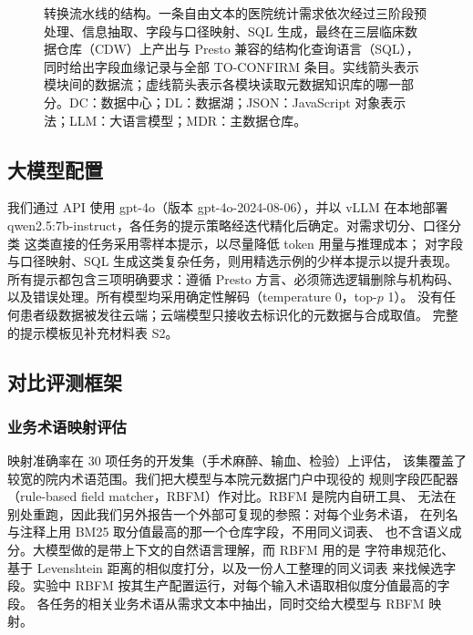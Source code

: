 \documentclass[11pt,a4paper]{article}
\begin{document}
\begin{figure}[H]
\caption{转换流水线的结构。一条自由文本的医院统计需求依次经过三阶段预处理、信息抽取、字段与口径映射、SQL 生成，最终在三层临床数据仓库（CDW）上产出与 Presto 兼容的结构化查询语言（SQL），同时给出字段血缘记录与全部 TO-CONFIRM 条目。实线箭头表示模块间的数据流；虚线箭头表示各模块读取元数据知识库的哪一部分。DC：数据中心；DL：数据湖；JSON：JavaScript 对象表示法；LLM：大语言模型；MDR：主数据仓库。}
\label{fig:arch}
\end{figure}

\subsection{大模型配置}
我们通过 API 使用 gpt-4o（版本 gpt-4o-2024-08-06），并以 vLLM 在本地部署
qwen2.5:7b-instruct，各任务的提示策略经迭代精化后确定。对需求切分、口径分类
这类直接的任务采用零样本提示，以尽量降低 token 用量与推理成本；
对字段与口径映射、SQL 生成这类复杂任务，则用精选示例的少样本提示以提升表现。
所有提示都包含三项明确要求：遵循 Presto 方言、必须筛选逻辑删除与机构码、
以及错误处理。所有模型均采用确定性解码（temperature 0，top-$p$ 1）。
没有任何患者级数据被发往云端；云端模型只接收去标识化的元数据与合成取值。
完整的提示模板见补充材料表 S2。

\subsection{对比评测框架}

\subsubsection{业务术语映射评估}
映射准确率在 30 项任务的开发集（手术麻醉、输血、检验）上评估，
该集覆盖了较宽的院内术语范围。我们把大模型与本院元数据门户中现役的
规则字段匹配器（rule-based field matcher，RBFM）作对比。RBFM 是院内自研工具、
无法在别处重跑，因此我们另外报告一个外部可复现的参照：对每个业务术语，
在列名与注释上用 BM25 取分值最高的那一个仓库字段，不用同义词表、
也不含语义成分。大模型做的是带上下文的自然语言理解，而 RBFM 用的是
字符串规范化、基于 Levenshtein 距离的相似度打分，以及一份人工整理的同义词表
来找候选字段。实验中 RBFM 按其生产配置运行，对每个输入术语取相似度分值最高的字段。
各任务的相关业务术语从需求文本中抽出，同时交给大模型与 RBFM 映射。
\end{document}
